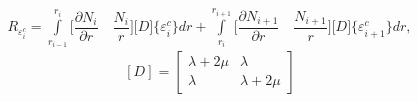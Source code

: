 \documentclass[12pt,a4paper]{article}
\begin{document}



\begin{equation}
    \begin{gathered}
    R_{\varepsilon^c_i} = \int\limits_{r_{i-1}}^{r_{i}} \bigl[\dfrac{\partial N_i}{\partial r} \quad \dfrac{ N_i}{r}\bigr] 
    \bigl[D\bigr]\{\varepsilon^c_i\}dr +
    \int\limits_{r_{i}}^{r_{i+1}} \bigl[\dfrac{\partial N_{i+1}}{\partial r} \quad \dfrac{ N_{i+1}}{r}\bigr] 
    \bigl[D\bigr]\{\varepsilon^c_{i+1}\}dr,
    \end{gathered}
\end{equation}
$$
[D]=\left[\begin{array}{cc}
\lambda+2 \mu & \lambda \\
\lambda & \lambda+2 \mu
\end{array}\right]
$$
\end{document}
